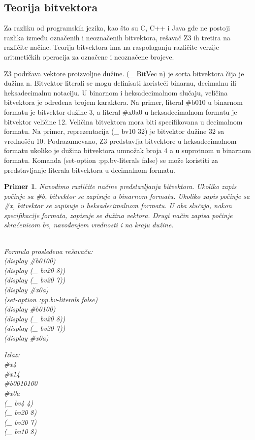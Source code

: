 \documentclass[12pt,oneside]{memoir}
\newtheorem{primer}{Primer}
\begin{document}
\subsection{Teorija bitvektora} 
Za razliku od programskih jezika, kao što su C, C++ i Java gde ne postoji razlika između označenih i neoznačenih bitvektora, rešavač Z3 ih tretira na različite načine. Teorija bitvektora ima na raspolaganju različite verzije aritmetičkih operacija za označene i neoznačene brojeve.
\par
Z3 podržava vektore proizvoljne dužine. (\_ BitVec n) je sorta bitvektora čija je dužina n. Bitvektor literali se mogu definisati koristeći binarnu, decimalnu ili heksadecimalnu notaciju. U binarnom i heksadecimalnom slučaju, veličina bitvektora je određena brojem karaktera. Na primer, literal \#b010 u binarnom formatu je bitvektor dužine 3, a literal \#x0a0 u heksadecimalnom formatu je bitvektor veličine 12. Veličina bitvektora mora biti specifikovana u decimalnom formatu. Na primer, reprezentacija (\_ bv10 32) je bitvektor dužine 32 sa vrednošću 10. Podrazumevano, Z3 predstavlja bitvektore u heksadecimalnom formatu ukoliko je dužina bitvektora umnožak broja 4 a u suprotnom u binarnom formatu. Komanda 
(set-option :pp.bv-literals false) se može koristiti za predstavljanje literala bitvektora u decimalnom formatu. 
\begin{primer} Navodimo različite načine predstavljanja bitvektora. Ukoliko zapis počinje sa \#b, bitvektor se zapisuje u binarnom formatu. Ukoliko zapis počinje sa \#x, bitvektor se zapisuje u heksadecimalnom formatu. U oba slučaja, nakon specifikacije formata, zapisuje se dužina vektora. Drugi način zapisa počinje skraćenicom bv, navođenjem vrednosti i na kraju dužine. \\\\
\begin{minipage}[b]{0.4\textwidth}
Formula prosleđena rešavaču:
\\(display \#b0100)
\\(display (\_ bv20 8))
\\(display (\_ bv20 7))
\\(display \#x0a) 
\\(set-option :pp.bv-literals false)
\\(display \#b0100)
\\(display (\_ bv20 8))
\\(display (\_ bv20 7))
\\(display \#x0a)
\end{minipage}
\hspace{2.5cm}
\begin{minipage}[t]{0.4\textwidth}
\vspace{-5.9cm}
Izlaz:
\\\#x4 
\\\#x14 
\\\#b0010100 
\\\#x0a 
\\(\_ bv4 4) 
\\(\_ bv20 8) 
\\(\_ bv20 7) 
\\(\_ bv10 8)
\end{minipage}


\end{primer}
\end{document}
